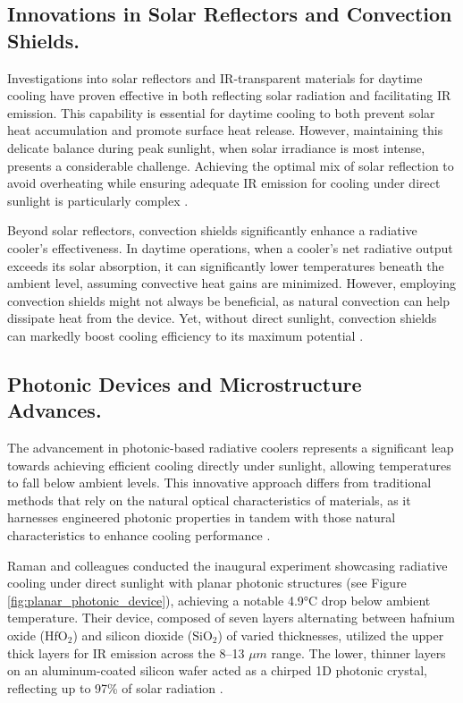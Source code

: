 \subsection{Innovations in Solar Reflectors and Convection Shields.}
Investigations into solar reflectors and IR-transparent materials for daytime cooling have proven effective in both reflecting solar radiation and facilitating IR emission. This capability is essential for daytime cooling to both prevent solar heat accumulation and promote surface heat release. However, maintaining this delicate balance during peak sunlight, when solar irradiance is most intense, presents a considerable challenge. Achieving the optimal mix of solar reflection to avoid overheating while ensuring adequate IR emission for cooling under direct sunlight is particularly complex \cite{hossain_radiative_2016}.

Beyond solar reflectors, convection shields significantly enhance a radiative cooler's effectiveness. In daytime operations, when a cooler's net radiative output exceeds its solar absorption, it can significantly lower temperatures beneath the ambient level, assuming convective heat gains are minimized. However, employing convection shields might not always be beneficial, as natural convection can help dissipate heat from the device. Yet, without direct sunlight, convection shields can markedly boost cooling efficiency to its maximum potential \cite{hossain_radiative_2016}.

\subsection{Photonic Devices and Microstructure Advances.}
The advancement in photonic-based radiative coolers represents a significant leap towards achieving efficient cooling directly under sunlight, allowing temperatures to fall below ambient levels. This innovative approach differs from traditional methods that rely on the natural optical characteristics of materials, as it harnesses engineered photonic properties in tandem with those natural characteristics to enhance cooling performance \cite{hossain_radiative_2016}.

Raman and colleagues conducted the inaugural experiment showcasing radiative cooling under direct sunlight with planar photonic structures (see Figure \ref{fig:planar_photonic_device}), achieving a notable 4.9°C drop below ambient temperature. Their device, composed of seven layers alternating between hafnium oxide ($\text{HfO}_2$) and silicon dioxide ($\text{SiO}_2$) of varied thicknesses, utilized the upper thick layers for IR emission across the 8–13 $\mu m$ range. The lower, thinner layers on an aluminum-coated silicon wafer acted as a chirped 1D photonic crystal, reflecting up to 97\% of solar radiation \cite{raman_passive_2014}.

